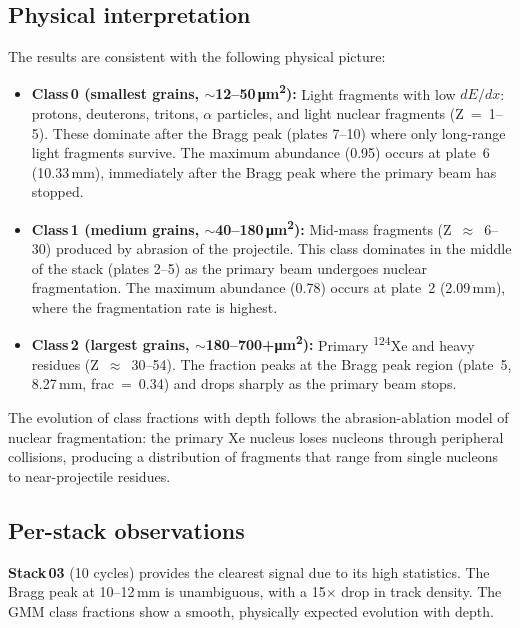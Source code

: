 \documentclass[12pt,a4paper]{article}
\begin{document}
\subsection{Physical interpretation}

The results are consistent with the following physical picture:

\begin{itemize}
  \item \textbf{Class\,0 (smallest grains, $\sim$12--50\,\si{\micro\meter\squared}):}
        Light fragments with low $dE/dx$: protons, deuterons,
        tritons, $\alpha$ particles, and light nuclear fragments
        (Z~=~1--5). These dominate after the Bragg peak (plates 7--10)
        where only long-range light fragments survive. The maximum
        abundance (0.95) occurs at plate~6 (10.33\,mm), immediately
        after the Bragg peak where the primary beam has stopped.

  \item \textbf{Class\,1 (medium grains,
        $\sim$40--180\,\si{\micro\meter\squared}):}
        Mid-mass fragments (Z~$\approx$~6--30) produced by abrasion of
        the projectile. This class dominates in the middle of the stack
        (plates 2--5) as the primary beam undergoes nuclear
        fragmentation. The maximum abundance (0.78) occurs at plate~2
        (2.09\,mm), where the fragmentation rate is highest.

  \item \textbf{Class\,2 (largest grains,
        $\sim$180--700+\;\si{\micro\meter\squared}):}
        Primary \textsuperscript{124}Xe and heavy residues
        (Z~$\approx$~30--54). The fraction peaks at the Bragg peak
        region (plate~5, 8.27\,mm, frac~=~0.34) and drops sharply as
        the primary beam stops.
\end{itemize}

The evolution of class fractions with depth follows the
abrasion-ablation model of nuclear fragmentation: the primary Xe
nucleus loses nucleons through peripheral collisions, producing a
distribution of fragments that range from single nucleons to
near-projectile residues.

\subsection{Per-stack observations}

\textbf{Stack\,03} (10 cycles) provides the clearest signal due to its
high statistics. The Bragg peak at 10--12\,mm is unambiguous, with a
15$\times$ drop in track density. The GMM class fractions show a
smooth, physically expected evolution with depth.
\end{document}
